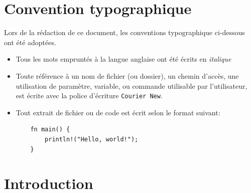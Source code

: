 \documentclass[a4paper, 12pt]{article}
\begin{document}
\section*{Convention typographique}
Lors de la rédaction de ce document, les conventions typographique ci-dessous ont
été adoptées.
\begin{itemize}[label=\textbullet]
	\item Tous les mots empruntés à la langue anglaise ont été écrits en \textit{italique}
	\item Toute référence à un nom de fichier (ou dossier), un chemin d’accès, une 
    utilisation de paramètre, variable, ou commande utilisable par l’utilisateur, 
    est écrite avec la police d’écriture \texttt{Courier New}.
	\item Tout extrait de fichier ou de code est écrit selon le format suivant:
    \begin{verbatim}
    fn main() {
        println!("Hello, world!");
    }
    \end{verbatim}
\end{itemize}
\newpage

\printglossary[type=\acronymtype,title={Acronymes}]
\newpage


\section{Introduction}
\end{document}
